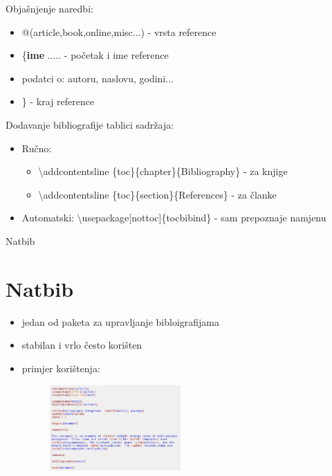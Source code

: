 \documentclass{beamer}
\begin{document}
\begin{frame}
Objašnjenje naredbi:
\begin{itemize}
    \item @(article,book,online,misc...) - vrsta reference \\
    \item \{\textbf{ime} ..... - početak i ime reference \\
    \item podatci o: autoru, naslovu, godini... \\
    \item \} - kraj reference
\end{itemize}
Dodavanje bibliografije tablici sadržaja:
\begin{itemize}
    \item Ručno: \\
    \begin{itemize}
        \item \textbackslash addcontentsline \{toc\}\{chapter\}\{Bibliography\} - za knjige \\
        \item \textbackslash addcontentsline \{toc\}\{section\}\{References\} - za članke \\
    \end{itemize}
    \item Automatski: \textbackslash usepackage[nottoc]\{tocbibind\} - sam prepoznaje namjenu\\
\end{itemize}
\end{frame}

\begin{frame}{Natbib}
\section{Natbib}
\begin{itemize}
	\item jedan od paketa za upravljanje bibloigrafijama \\
	\item stabilan i vrlo često korišten \\
	\item primjer korištenja: \\ 
	\begin{figure}
	\includegraphics[width=5cm]{natbibprimjer.png}
	\end{figure}
\end{itemize}
\end{frame}
\end{document}
